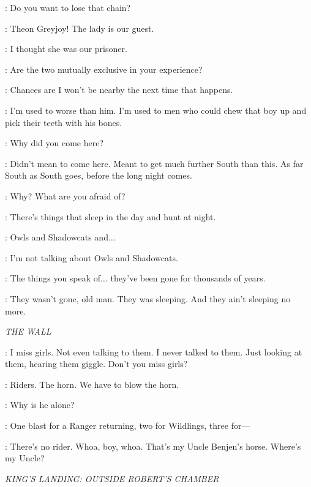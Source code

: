\THEON:  Do you want to lose that chain? 


\LUWIN: Theon Greyjoy! The lady is our guest. 

\THEON: I thought she was our prisoner. 

\LUWIN: Are the two mutually exclusive in your experience? 


\LUWIN: Chances are I won't be nearby the next time that happens. 

\OSHA: I'm used to worse than him. I'm used to men who could chew that boy up and pick their teeth with his bones. 

\LUWIN: Why did you come here? 

\OSHA: Didn't mean to come here. Meant to get much further South than this. As far South as South goes, before the long night comes. 

\LUWIN: Why? What are you afraid of? 

\OSHA: There's things that sleep in the day and hunt at night. 

\LUWIN: Owls and Shadowcats and$\ldots$ 

\OSHA: I'm not talking about Owls and Shadowcats. 

\LUWIN: The things you speak of$\ldots$ they've been gone for thousands of years. 

\OSHA: They wasn't gone, old man. They was sleeping. And they ain't sleeping no more. 


\scene

\textit{THE WALL} 


\SAM: I miss girls. Not even talking to them. I never talked to them. Just looking at them, hearing them giggle. Don't you miss girls?

\SAM:  Riders.  The horn. We have to blow the horn. 

\JON: Why is he alone? 

\SAM: One blast for a Ranger returning, two for Wildlings, three for---

\JON: There's no rider.  Whoa, boy, whoa. That's my Uncle Benjen's horse. Where's my Uncle? 


\scene

\textit{KING'S LANDING: OUTSIDE ROBERT'S CHAMBER} 

